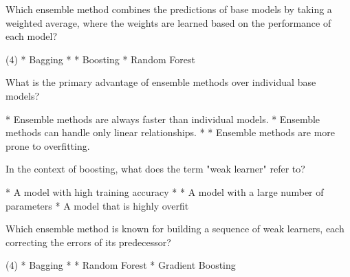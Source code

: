 \documentclass[10pt]{extarticle}
\begin{document}
\begin{exercise}
    Which ensemble method combines the predictions of base models by taking a weighted average, where the weights are learned based on the performance of each model?
    \begin{choice}(4)
        * Bagging
        * 
        * Boosting
        * Random Forest
    \end{choice}
\end{exercise}
\begin{solution}
\end{solution}

\begin{exercise}
    What is the primary advantage of ensemble methods over individual base models?
    \begin{choice}
        * Ensemble methods are always faster than individual models.
        * Ensemble methods can handle only linear relationships.
        * 
        * Ensemble methods are more prone to overfitting.
    \end{choice}
\end{exercise}
\begin{solution}
\end{solution}

\begin{exercise}
    In the context of boosting, what does the term "weak learner" refer to?
    \begin{choice}
        * A model with high training accuracy
        * 
        * A model with a large number of parameters
        * A model that is highly overfit
    \end{choice}
\end{exercise}
\begin{solution}
\end{solution}

\begin{exercise}
    Which ensemble method is known for building a sequence of weak learners, each correcting the errors of its predecessor?
    \begin{choice} (4)
        * Bagging
        * 
        * Random Forest
        * Gradient Boosting
    \end{choice}
\end{exercise}
\begin{solution}
\end{solution}
\end{document}
